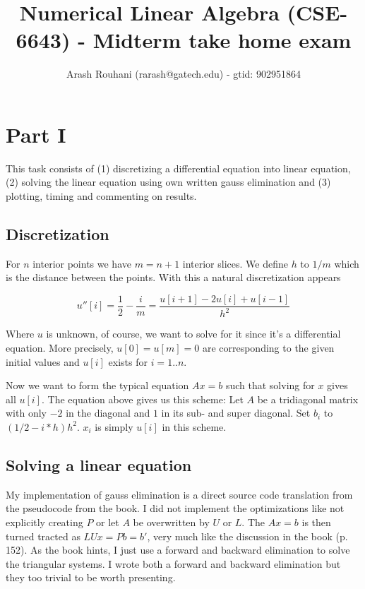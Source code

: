 \documentclass[a4paper,11pt]{article}
\title{Numerical Linear Algebra (CSE-6643) - Midterm take home exam}
\author{Arash Rouhani (rarash@gatech.edu) - gtid: 902951864}
\begin{document}
\maketitle

\section{Part I}

This task consists of (1) discretizing a differential equation into
linear equation, (2) solving the linear equation using own
written gauss elimination and (3) plotting,  timing and commenting on
results.

\subsection{Discretization}

For $n$ interior points we have $m=n+1$ interior slices. We define $h$
to $1/m$ which is the distance between the points. With this a natural
discretization appears

\[
  u''[i] = \frac{1}{2} - \frac{i}{m} = \frac{u[i+1]-2u[i]+u[i-1]}{h^2}
\]

Where $u$ is unknown, of course, we want to solve for it since it's a
differential equation. More precisely, $u[0]=u[m]=0$ are corresponding
to the given initial values and $u[i]$ exists for $i = 1..n$.

Now we want to form the typical equation $Ax=b$ such that solving for
$x$ gives all $u[i]$. The equation above gives us this scheme: Let $A$
be a tridiagonal matrix with only $-2$ in the diagonal and $1$ in its
sub- and super diagonal. Set $b_i$ to $(1/2-i*h)h^2$. $x_i$ is simply
$u[i]$ in this scheme.

\subsection{Solving a linear equation}

My implementation of gauss elimination is a direct source code
translation from the pseudocode from the book. I did not implement the
optimizations like not explicitly creating $P$ or let $A$ be overwritten
by $U$ or $L$. The $Ax=b$ is then turned tracted as $LUx=Pb=b'$, very much
like the discussion in the book (p. 152). As the book hints, I just
use a forward and backward elimination to solve the triangular
systems. I wrote both a forward and backward elimination but they too
trivial to be worth presenting.
\end{document}
